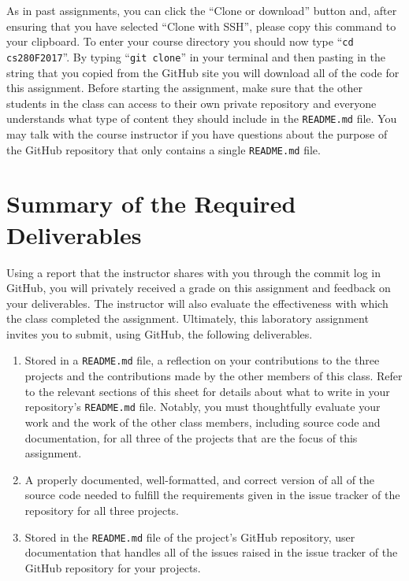 \documentclass[11pt]{article}
\newcommand{\reflection}{\lstinline{README.md}}
\newcommand{\command}[1]{``\lstinline{#1}''}
\begin{document}
As in past assignments, you can click the ``Clone or download'' button and, after ensuring that you have selected
``Clone with SSH'', please copy this command to your clipboard. To enter your course directory you should now type
\command{cd cs280F2017}. By typing \command{git clone} in your terminal and then pasting in the string that you copied
from the GitHub site you will download all of the code for this assignment. Before starting the assignment, make sure
that the other students in the class can access to their own private repository and everyone understands what type of
content they should include in the \reflection{} file. You may talk with the course instructor if you have questions
about the purpose of the GitHub repository that only contains a single \reflection{} file.

\section*{Summary of the Required Deliverables}

Using a report that the instructor shares with you through the commit log in GitHub, you will privately received a grade
on this assignment and feedback on your deliverables. The instructor will also evaluate the effectiveness with which the
class completed the assignment. Ultimately, this laboratory assignment invites you to submit, using GitHub, the
following deliverables.

\vspace*{-.5em}

\begin{enumerate}

\setlength{\itemsep}{0in}

\item Stored in a \reflection{} file, a reflection on your contributions to the three projects and the contributions
  made by the other members of this class. Refer to the relevant sections of this sheet for details about what to write
  in your repository's \reflection{} file. Notably, you must thoughtfully evaluate your work and the work of the other
  class members, including source code and documentation, for all three of the projects that are the focus of this
  assignment.

\item A properly documented, well-formatted, and correct version of all of the source code needed to fulfill the
  requirements given in the issue tracker of the repository for all three projects.

\item Stored in the \reflection{} file of the project's GitHub repository, user documentation that handles all of the
  issues raised in the issue tracker of the GitHub repository for your projects.

\end{enumerate}
\end{document}
